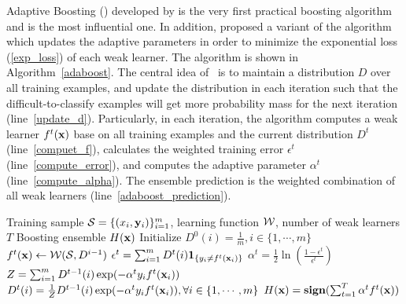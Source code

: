 {Adaptive Boosting (\adaboost) developed by \citet{Freund97a} is the very first practical boosting algorithm and is the most influential one.
In addition, \citet{Schapire99improved} proposed a variant of the algorithm which updates the adaptive parameters in order to minimize the exponential loss (\ref{exp_loss}) of each weak learner.
The algorithm is shown in Algorithm~\ref{adaboost}.
The central idea of \adaboost\ is to maintain a distribution $D$ over all training examples, and update the distribution in each iteration such that the difficult-to-classify examples will get more probability mass for the next iteration (line~\ref{update_d}).
Particularly, in each iteration, the algorithm computes a weak learner $f^t(\mathbf {x})$ base on all training examples and the current distribution $D^{t}$ (line~\ref{compuet_f}), calculates the weighted training error $\epsilon^t$ (line~\ref{compute_error}), and computes the adaptive parameter $\alpha^t$ (line~\ref{compute_alpha}).
The ensemble prediction is the weighted combination of all weak learners (line~\ref{adaboost_prediction}).

\begin{algorithm}
\caption{\adaboost}
\label{adaboost}
\begin{algorithmic}[1]
	\REQUIRE Training sample $\mathcal{S} = \{(x_i,\mathbf {y}_i)\}_{i=1}^m$, learning function $\mathcal{W}$, number of weak learners $T$
	\ENSURE Boosting ensemble $H(\mathbf {x})$
	\STATE Initialize $D^0(i)=\frac{1}{m},i\in\{1,\cdots,m\}$
		\STATE $f^t(\mathbf {x})\leftarrow\mathcal{W}(\mathcal{S},D^{i-1})$ \label{compuet_f}
		\STATE $\epsilon^t = \sum_{i=1}^{m}D^t(i)\mathbf{1}_{\{y_i\neq f^t(\mathbf {x}_i)\}}$ \label{compute_error}
		\STATE $\alpha^{t} = \frac{1}{2}\ln\left(\frac{1-\epsilon^t}{\epsilon^t}\right)$ \label{compute_alpha}
		\STATE $Z=\sum_{i=1}^{m}D^{t-1}(i)\exp(-\alpha^ty_if^t(\mathbf {x}_i))$
		\STATE $D^t(i) = \frac{1}{Z}D^{t-1}(i)\exp(-\alpha^ty_if^t(\mathbf {x}_i)),\forall i\in\{1,\cdots,m\}$ \label{update_d}
	\ENDFOR
	\RETURN $H(\mathbf {x}) = \textbf{sign}(\sum_{t=1}^T\alpha^tf^t(\mathbf {x}))$ \label{adaboost_prediction}
\end{algorithmic}
\end{algorithm}

}
